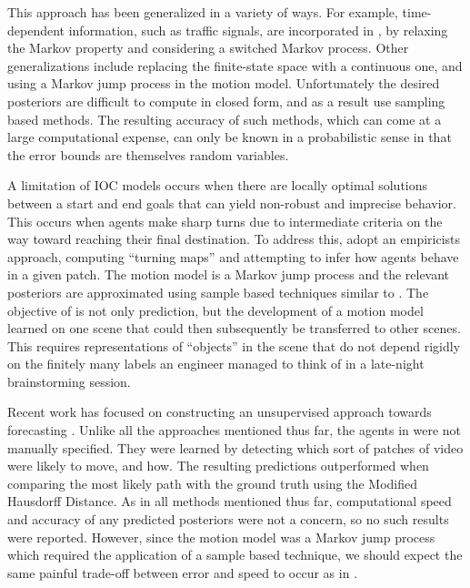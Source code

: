 \documentclass[letterpaper,10pt,conference]{ieeetran}
\begin{document}
This approach has been generalized in a variety of ways.
For example, time-dependent information, such as traffic signals, are incorporated in \cite{Karasev2016}, by relaxing the Markov property and considering a switched Markov process.
Other generalizations include replacing the finite-state space with a continuous one, and using a Markov jump process in the motion model.
Unfortunately the desired posteriors are difficult to compute in closed form, and as a result use sampling based methods.
The resulting accuracy of such methods, which can come at a large computational expense, can only be known in a probabilistic sense in that the error bounds are themselves random variables.

A limitation of IOC models occurs when there are locally optimal solutions between a start and end goals that can yield non-robust and imprecise behavior.
This occurs when agents make sharp turns due to intermediate criteria on the way toward reaching their final destination.
To address this, \cite{Ballan2016} adopt an empiricists approach, computing ``turning maps'' and attempting to infer how agents behave in a given patch.
The motion model is a Markov jump process and the relevant posteriors are approximated using sample based techniques similar to \cite{Karasev2016}.
The objective of \cite{Ballan2016} is not only prediction, but the development of a motion model learned on one scene that could then subsequently be transferred to other scenes. 
This requires representations of ``objects'' in the scene that do not depend rigidly on the finitely many labels an engineer managed to think of in a late-night brainstorming session.

Recent work has focused on constructing an unsupervised approach towards forecasting  \cite{Walker2014}.
Unlike all the approaches mentioned thus far, the agents in \cite{Walker2014} were not manually specified.
They were learned by detecting which sort of patches of video were likely to move, and how.
The resulting predictions outperformed \cite{Kitani2012} when comparing the most likely path with the ground truth using the Modified Hausdorff Distance.
As in all methods mentioned thus far, computational speed and accuracy of any predicted posteriors were not a concern, so no such results were reported.
However, since the motion model was a Markov jump process which required the application of a sample based technique, we should expect the same painful trade-off between error and speed to occur as in \cite{Karasev2016,Ballan2016}.
\end{document}
